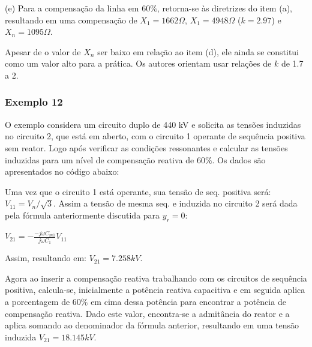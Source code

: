 (e) Para a compensação da linha em $60\%$, retorna-se às diretrizes do item (a), resultando em uma compensação de $X_1 = 1662 \Omega$, $X_1 = 4948 \Omega$ ($k=2.97$) e $X_n = 1095 \Omega$.



Apesar de o valor de $X_n$ ser baixo em relação ao item (d), ele ainda se constitui como um valor alto para a prática. Os autores orientam usar relações de $k$ de 1.7 a 2.





\subsubsection*{Exemplo 12}

O exemplo considera um circuito duplo de 440 kV e solicita as tensões induzidas no circuito 2, que está em aberto, com o circuito 1 operante de sequência positiva sem reator. Logo após verificar as condições ressonantes e calcular as tensões induzidas para um nível de compensação reativa de $60\%$. Os dados são apresentados no código abaixo:



Uma vez que o circuito 1 está operante, sua tensão de seq. positiva será: $V_{11} = V_n/\sqrt{3}$. Assim a tensão de mesma seq. e induzida no circuito 2 será dada pela fórmula anteriormente discutida para $y_r=0$:

\begin{center}
    $V_{21} = -\frac{-j\omega C_{m1}}{j\omega C_1} V_{11}$
\end{center}

Assim, resultando em: $V_{21} = 7.258 kV$.



Agora ao inserir a compensação reativa trabalhando com os circuitos de sequência positiva, calcula-se, inicialmente a potência reativa capacitiva e em seguida aplica a porcentagem de $60\%$ em cima dessa potência para encontrar a potência de compensação reativa. Dado este valor, encontra-se a admitância do reator e a aplica somando ao denominador da fórmula anterior, resultando em uma tensão induzida $V_{21} = 18.145kV$.



